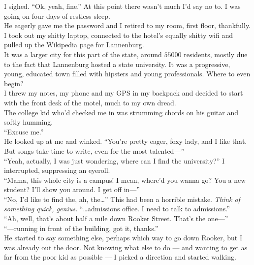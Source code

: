 \documentclass[a5paper]{scrartcl}
\begin{document}
I sighed. \enquote{Ok, yeah, fine.} At this point there wasn't much I'd say no to. I was going on four days of restless sleep.\\


He eagerly gave me the password and I retired to my room, first floor, thankfully. I took out my shitty laptop, connected to the hotel's equally shitty wifi and pulled up the Wikipedia page for Lannenburg.\\


It was a larger city for this part of the state, around $\num{55000}$ residents, mostly due to the fact that Lannenburg hosted a state university. It was a progressive, young, educated town filled with hipsters and young professionals. Where to even begin?\\


I threw my notes, my phone and my GPS in my backpack and decided to start with the front desk of the motel, much to my own dread.\\


The college kid who'd checked me in was strumming chords on his guitar and softly humming.\\


\enquote{Excuse me.}\\


He looked up at me and winked. \enquote{You're pretty eager, foxy lady, and I like that. But songs take time to write, even for the most talented---}\\


\enquote{Yeah, actually, I was just wondering, where can I find the university?} I interrupted, suppressing an eyeroll.\\


\enquote{Mama, this whole city is a campus! I mean, where'd you wanna go? You a new student? I'll show you around. I get off in---}\\


\enquote{No, I'd like to find the, ah, the\dots} This had been a horrible mistake. \textit{Think of something quick, genius.}
 \enquote{\dots admissions office. I need to talk to admissions.}\\


\enquote{Ah, well, that's about half a mile down Rooker Street. That's the one---}\\


\enquote{---running in front of the building, got it, thanks.}\\


He started to say something else, perhaps which way to go down Rooker, but I was already out the door. Not knowing what else to do --- and wanting to get as far from the poor kid as possible --- I picked a direction and started walking.\\
\end{document}
